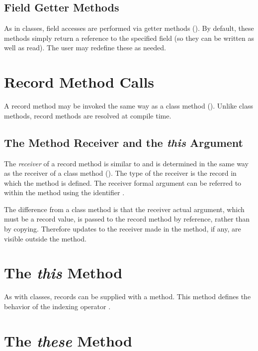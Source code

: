 \subsection{Field Getter Methods}
\label{Field_Getter_Methods}

As in classes, field accesses are performed via getter methods
().  By default, these methods simply return a reference to
the specified field (so they can be written as well as read).  The user may
redefine these as needed.

\section{Record Method Calls}
\label{Record_Method_Access}

A record method may be invoked the same way as a class method
().  Unlike class methods, record methods are
resolved at compile time.  

\subsection{The Method Receiver and the {\em this} Argument}
\label{The_this_Reference}

The \emph{receiver} of a record method is similar to and is determined in the
same way as the receiver of a class method ().
The type of the receiver is the record in which the method is defined.
The receiver formal argument can be referred to within the method
using the identifier .

The difference from a class method is that the receiver actual argument,
which must be a record value, is passed to the record method by reference,
rather than by copying. Therefore updates to the receiver made in the
method, if any, are visible outside the method.

\section{The {\em this} Method}

As with classes, records can be supplied with a  method.  This method
defines the behavior of the indexing operator \chpl{[]}.

\section{The {\em these} Method}

